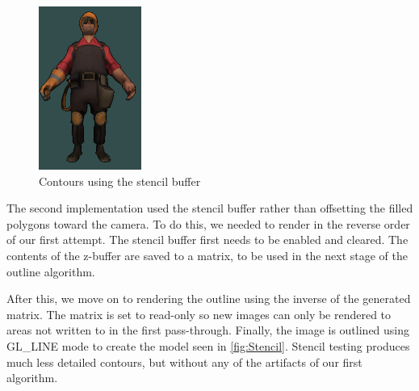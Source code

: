 \begin{figure}[h]
    \centering
    \includegraphics[width=0.3\textwidth]{img/ModelD.png}
    \caption{Contours using the stencil buffer}
    \label{fig:Stencil}
\end{figure}

The second implementation used the stencil buffer rather than offsetting the filled polygons toward the camera. To do this, we needed to render 
in the reverse order of our first attempt. The stencil buffer first needs to be enabled and cleared. The contents
of the z-buffer are saved to a matrix, to be used in the next stage of the outline algorithm.
 
After this, we move on to rendering the outline using the inverse of the generated matrix. The matrix is
set to read-only so new images can only be rendered to areas not written to in the first pass-through.
Finally, the image is outlined using GL\_LINE mode to create the model seen in \autoref{fig:Stencil}. Stencil testing 
produces much less detailed contours, but without any of the artifacts of our first algorithm.

\newpage
{}

